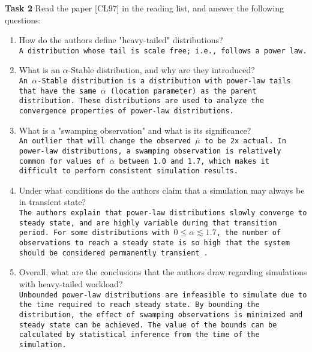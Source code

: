 \documentclass{article}
\begin{document}
\bigskip
\newpage


\textbf{Task 2}
Read the paper [CL97] in the reading list, and answer the following questions:
\begin{enumerate}[label=(\alph*)]
\item How do the authors define "heavy-tailed" distributions?
\medskip\\\texttt{A distribution whose tail is scale free; i.e., follows a power law.}
\item What is an $\alpha$-Stable distribution, and why are they introduced?
\medskip\\\texttt{An $\alpha$-Stable distribution is a distribution with power-law tails that have the same $\alpha$ (location parameter) as the parent distribution. These distributions are used to analyze the convergence properties of power-law distributions.}
\item What is a "swamping observation" and what is its significance?
\medskip\\\texttt{An outlier that will change the observed $\bar{\mu}$ to be 2x actual. In power-law distributions, a swamping observation is relatively common for values of $\alpha$ between 1.0 and 1.7, which makes it difficult to perform consistent simulation results.}
\item Under what conditions do the authors claim that a simulation may always be in transient state?
\medskip\\\texttt{The authors explain that power-law distributions slowly converge to steady state, and are highly variable during that transition period. For some distributions with $0 \le \alpha \lesssim 1.7$, the number of observations to reach a steady state is so high that the system should be considered permanently transient .}
\item Overall, what are the conclusions that the authors draw regarding simulations with heavy-tailed workload?
\medskip\\\texttt{Unbounded power-law distributions are infeasible to simulate due to the time required to reach steady state. By bounding the distribution, the effect of swamping observations is minimized and steady state can be achieved. The value of the bounds can be calculated by statistical inference from the time of the simulation. }
\end{enumerate}
\bigskip
\newpage
\end{document}
